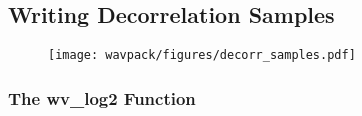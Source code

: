 
\subsection{Writing Decorrelation Samples}
\label{wavpack:write_decorr_samples}
{
  
}

\begin{figure}[h]
  \texttt{[image: wavpack/figures/decorr\_samples.pdf]}
\end{figure}

\clearpage

\subsubsection{The wv\_log2 Function}
\label{wavpack:encode_wv_log2}
{
  
}

\clearpage

